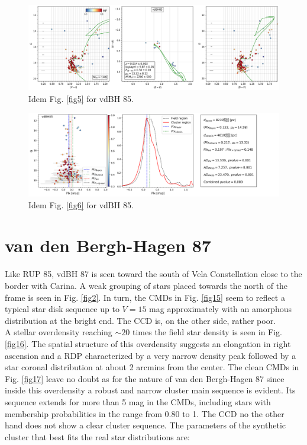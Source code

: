 \documentclass[draft]{aa}
\begin{document}
\begin{figure}[ht]
    \centering
    \includegraphics[width=\hsize]{../figs/cmds_vdbh85.png}
    \caption{Idem Fig. \ref{fig5} for vdBH 85.}
    \label{fig13}
\end{figure}

\begin{figure}[ht]
    \centering
    \includegraphics[width=\hsize]{../figs/plx_vdBH85.png}
    \caption{Idem Fig. \ref{fig6} for vdBH 85.}
    \label{fig14}
\end{figure}



\section{van den Bergh-Hagen 87}

Like RUP 85, vdBH 87 is seen toward the south of Vela Constellation close to
the border with Carina. A weak grouping of stars placed towards the north of
the frame is seen in Fig. \ref{fig2}. In turn, the CMDs in Fig. \ref{fig15}
seem to reflect a typical star disk sequence up to $V = 15$ mag approximately
with an amorphous distribution at the bright end. The CCD is, on the other
side, rather poor.\\

A stellar overdensity reaching $\sim20$ times the field star density is
seen in Fig. \ref{fig16}. The spatial structure of this overdensity suggests an
elongation in right ascension and a RDP characterized by a very narrow density
peak followed by a star coronal distribution at about 2 arcmins from the center.
The clean CMDs in Fig. \ref{fig17} leave no doubt as for the nature of van den
Bergh-Hagen 87 since inside this overdensity a robust and narrow cluster main
sequence is evident. Its sequence extends for more than 5 mag in the
CMDs, including stars with membership probabilities in the range from 0.80 to
1. The CCD no the other hand does not show a clear cluster sequence.
The parameters of the synthetic cluster that best fits the real star
distributions are:
\end{document}
